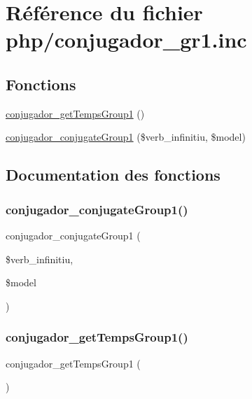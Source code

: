 \hypertarget{php_2conjugador__gr1_8inc}{}\section{Référence du fichier php/conjugador\+\_\+gr1.inc}
\label{php_2conjugador__gr1_8inc}
\subsection*{Fonctions}
\begin{DoxyCompactItemize}
\item 
\hyperlink{php_2conjugador__gr1_8inc_a3bf48675f6020dac50d8c00a36a697ab}{conjugador\+\_\+get\+Temps\+Group1} ()
\item 
\hyperlink{php_2conjugador__gr1_8inc_aaaea7cba73e7edd4322fe06a04c16892}{conjugador\+\_\+conjugate\+Group1} (\$verb\+\_\+infinitiu, \$model)
\end{DoxyCompactItemize}


\subsection{Documentation des fonctions}
\hypertarget{php_2conjugador__gr1_8inc_aaaea7cba73e7edd4322fe06a04c16892}{}\label{php_2conjugador__gr1_8inc_aaaea7cba73e7edd4322fe06a04c16892} 
\subsubsection{\texorpdfstring{conjugador\+\_\+conjugate\+Group1()}{conjugador\_conjugateGroup1()}}
{\footnotesize\ttfamily conjugador\+\_\+conjugate\+Group1 (\begin{DoxyParamCaption}\item[{}]{\$verb\+\_\+infinitiu,  }\item[{}]{\$model }\end{DoxyParamCaption})}

\hypertarget{php_2conjugador__gr1_8inc_a3bf48675f6020dac50d8c00a36a697ab}{}\label{php_2conjugador__gr1_8inc_a3bf48675f6020dac50d8c00a36a697ab} 
\subsubsection{\texorpdfstring{conjugador\+\_\+get\+Temps\+Group1()}{conjugador\_getTempsGroup1()}}
{\footnotesize\ttfamily conjugador\+\_\+get\+Temps\+Group1 (\begin{DoxyParamCaption}{ }\end{DoxyParamCaption})}

